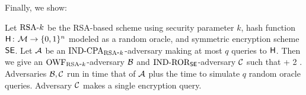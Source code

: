 Finally, we show:
\newcommand{\INDROR}{\textnormal{IND-ROR}\xspace}
\begin{thm}
Let $\textnormal{RSA}\mbox{-} k$ be the RSA-based scheme using
security parameter $k$, hash function
$\mathsf{H}{{\kern .05em}\colon{\kern .05em}}{\cal M}\rightarrow\{0,1\}^n$ modeled as a random oracle, and
symmetric encryption scheme $\textnormal{\textsf{SE}}$. Let ${\mathcal A}$ be
an $\textnormal{IND-CPA}_{\textnormal{RSA}\mbox{-} k}$-adversary making at most $q$ queries to
$\mathsf{H}$. Then we give an
$\textnormal{OWF}_{\textnormal{RSA}\mbox{-} k}$-adversary ${\mathcal B}$ and $\INDROR_\SEscheme$-adversary
${\mathcal C}$ such that
\bnm
  \AdvINDCPA{\RSAk,\Horacle}{\advA} \cdotsm\AdvOWF{\RSAk}{\advB} +  
        2\cdotsm\AdvROR{\SEscheme}{\advC}  \;.
\enm
Adversaries ${\mathcal B},{\mathcal C}$ run in time that of ${\mathcal A}$ plus 
the time to simulate $q$ random oracle queries. Adversary ${\mathcal C}$ makes a single encryption query.
\end{thm}


